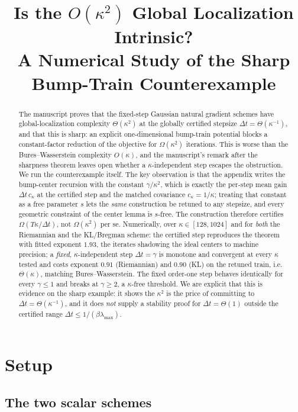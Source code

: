 \documentclass[11pt]{article}
\title{Is the $O(\kappa^2)$ Global Localization Intrinsic?\\
A Numerical Study of the Sharp Bump-Train Counterexample}
\author{}
\date{}
\begin{document}
\maketitle

\begin{abstract}
The manuscript proves that the fixed-step Gaussian natural gradient schemes have
global-localization complexity $\Theta(\kappa^2)$ at the globally certified
stepsize $\Delta t=\Theta(\kappa^{-1})$, and that this is sharp: an explicit
one-dimensional bump-train potential blocks a constant-factor reduction of the
objective for $\Omega(\kappa^2)$ iterations. This is worse than the
Bures--Wasserstein complexity $O(\kappa)$, and the manuscript's remark after the
sharpness theorem leaves open whether a $\kappa$-independent step escapes the
obstruction. We run the counterexample itself. The key observation is that the
appendix writes the bump-center recursion with the constant $\gamma/\kappa^2$,
which is exactly the per-step mean gain $\Delta t\,c_\kappa$ at the certified step
and the matched covariance $c_\kappa=1/\kappa$; treating that constant as a free
parameter $s$ lets the \emph{same} construction be retuned to any stepsize, and
every geometric constraint of the center lemma is $s$-free. The construction
therefore certifies $\Omega(T\kappa/\Delta t)$, not $\Omega(\kappa^2)$ per se.
Numerically, over $\kappa\in[128,1024]$ and for \emph{both} the Riemannian and the
KL/Bregman scheme: the certified step reproduces the theorem with fitted exponent
$1.93$, the iterates shadowing the ideal centers to machine precision; a
\emph{fixed}, $\kappa$-independent step $\Delta t=\gamma$ is monotone and
convergent at every $\kappa$ tested and costs exponent $0.91$ (Riemannian) and
$0.90$ (KL) on the retuned train, i.e.\ $\Theta(\kappa)$, matching
Bures--Wasserstein. The fixed order-one step behaves identically for every
$\gamma\le1$ and breaks at $\gamma\ge2$, a $\kappa$-free threshold. We are explicit
that this is evidence on the sharp example: it shows the $\kappa^2$ is the price of
committing to $\Delta t=\Theta(\kappa^{-1})$, and it does \emph{not} supply a
stability proof for $\Delta t=\Theta(1)$ outside the certified range
$\Delta t\le1/(\beta\lambda_{\max})$.
\end{abstract}

\section{Setup}
\label{sec:setup}

\subsection{The two scalar schemes}
\end{document}
